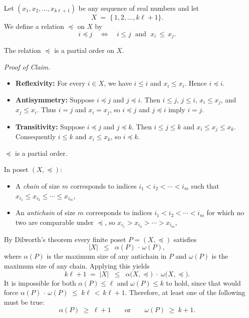 \documentclass{report}
\begin{document}
\begin{proofWithHibiscus}
  Let $(x_1, x_2, \ldots, x_{k\ell + 1})$ be any sequence of real numbers and let 
  \[
    X \;=\; \{\,1,2,\ldots, k\ell + 1\}.
  \]
  We define a relation $\preceq$ on $X$ by 
  \[
    i \preceq j 
    \quad\Longleftrightarrow\quad 
    i \le j 
    \;\text{ and }\;
    x_i \,\le\, x_j.
  \]
  \smallskip

  \begin{ClaimWithMagnolia}
    The relation $\preceq$ is a partial order on $X$.
    
    \medskip
    \noindent
    \emph{Proof of Claim.} 
    \begin{itemize}
      \item \textbf{Reflexivity:} 
      For every $i \in X$, we have $i \le i$ and $x_i \le x_i$. Hence $i \preceq i$.
      
      \item \textbf{Antisymmetry:} 
      Suppose $i \preceq j$ and $j \preceq i$. Then $i \le j$, $j \le i$, $x_i \le x_j$, and $x_j \le x_i$. 
      Thus $i = j$ and $x_i = x_j$, so $i \preceq j$ and $j \preceq i$ imply $i=j$.
      
      \item \textbf{Transitivity:} 
      Suppose $i \preceq j$ and $j \preceq k$. Then $i \le j \le k$ and 
      $x_i \le x_j \le x_k$. Consequently $i \le k$ and $x_i \le x_k$, so $i \preceq k$.
    \end{itemize}
    $\preceq$ is a partial order.
  \end{ClaimWithMagnolia}

  \medskip
  In poset $(X, \preceq)$:
  \begin{itemize}
    \item A \emph{chain} of size $m$ corresponds to indices 
      $i_1 < i_2 < \cdots < i_m$ such that 
      $x_{i_1} \le x_{i_2} \le \cdots \le x_{i_m}$,
    \item An \emph{antichain} of size $m$ corresponds to indices 
      $i_1 < i_2 < \cdots < i_m$ for which no two are comparable under $\preceq$, so
      $x_{i_1} > x_{i_2} > \cdots > x_{i_m}$, 
  \end{itemize}

  By Dilworth's theorem every finite poset $P=(X,\preceq)$ satisfies
  \[
    |X|\;\;\le\;\;\alpha(P)\,\cdot\,\omega(P),
  \]
  where $\alpha(P)$ is the maximum size of any antichain in $P$ and $\omega(P)$ is the maximum size of any chain. 
  Applying this yields
  \[
    k\ell + 1 
    \;=\;
    |X|
    \;\;\le\;\;
    \alpha\bigl(X,\preceq\bigr)\;\cdot\;\omega\bigl(X,\preceq\bigr).
  \]
  It is impossible for both $\alpha(P) \le \ell$ and $\omega(P) \le k$ to hold, 
  since that would force 
  \(
    \alpha(P)\,\cdot\,\omega(P) \;\le\; k\ell \,<\, k\ell+1.
  \)
  Therefore, at least one of the following must be true:
  \[
    \alpha(P) \;\ge\; \ell + 1
    \qquad\text{or}\qquad
    \omega(P) \;\ge\; k + 1.
  \]
\end{proofWithHibiscus}
\end{document}
